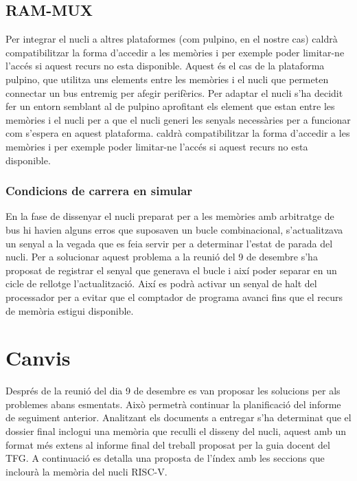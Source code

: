 \documentclass[conference,onecolumn, catalan]{IEEEtran}
\begin{document}
\subsection{RAM-MUX}

Per integrar el nucli a altres plataformes (com pulpino, en el nostre cas) caldrà compatibilitzar la forma d'accedir a les memòries i per exemple poder limitar-ne l'accés si aquest recurs no esta disponible. Aquest és el cas de la plataforma pulpino, que utilitza uns elements entre les memòries i el nucli que permeten connectar un bus entremig per afegir perifèrics. Per adaptar el nucli s'ha decidit fer un entorn semblant al de pulpino aprofitant els element que estan entre les memòries i el nucli per a que el nucli generi les senyals necessàries per a funcionar com s'espera en aquest plataforma.
caldrà compatibilitzar la forma d'accedir a les memòries i per exemple poder limitar-ne l'accés si aquest recurs no esta disponible.


\subsubsection{Condicions de carrera en simular} 

En la fase de dissenyar el nucli preparat per a les memòries amb arbitratge de bus hi havien alguns erros que suposaven un bucle combinacional, s'actualitzava un senyal a la vegada que es feia servir per a determinar l'estat de parada del nucli.
Per a solucionar aquest problema a la reunió del 9 de desembre s'ha proposat de registrar el senyal que generava el bucle i així poder separar en un cicle de rellotge l'actualització. Així es podrà activar un senyal de halt del processador per a evitar que el comptador de programa avanci fins que el recurs de memòria estigui disponible.









\section{Canvis}
Després de la reunió del dia 9 de desembre es van proposar les solucions per als problemes abans esmentats. Això permetrà continuar la planificació del informe de seguiment anterior. Analitzant els documents a entregar s'ha determinat que el dossier final inclogui una memòria que reculli el disseny del nucli, aquest amb un format més extens al informe final del treball proposat per la guia docent del TFG. A continuació es detalla una proposta de l'índex amb les seccions que inclourà la memòria del nucli RISC-V.











\end{document}
